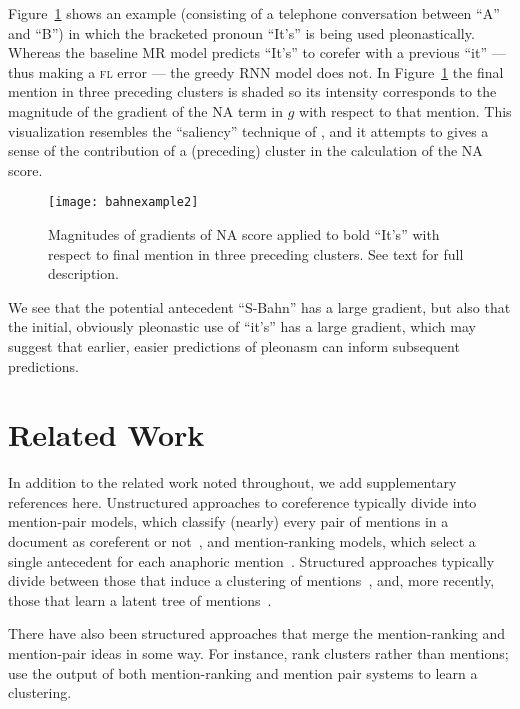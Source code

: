 \documentclass[11pt,letterpaper]{article}
\begin{document}
Figure~\ref{fig:flviz} shows an example (consisting of a telephone conversation between ``A'' and ``B'') in which the bracketed pronoun ``It's'' is being used pleonastically. Whereas the baseline MR model predicts ``It's'' to corefer with a previous ``it'' --- thus making a \textsc{fl} error --- the greedy RNN model does not. In Figure~\ref{fig:flviz} the final mention in three preceding clusters is shaded so its intensity corresponds to the magnitude of the gradient of the $\mathrm{NA}$ term in $g$ with respect to that mention. This visualization resembles the ``saliency'' technique of , and it attempts to gives a sense of the contribution of a (preceding) cluster in the  calculation of the $\mathrm{NA}$ score.

\begin{figure}[t!]
\centering
\texttt{[image: bahnexample2]}
\caption{Magnitudes of gradients of $\mathrm{NA}$ score applied to bold ``It's'' with respect to final mention in three preceding clusters. See text for full description.}
\label{fig:flviz}
\end{figure}

We see that the potential antecedent ``S-Bahn'' has a large gradient, but also that the initial, obviously pleonastic use of ``it's'' has a large gradient, which may suggest that earlier, easier predictions of pleonasm can inform subsequent predictions.
 
\section{Related Work}
In addition to the related work noted throughout, we add supplementary references here. Unstructured approaches to coreference typically divide into mention-pair models, which classify (nearly) every pair of mentions in a document as coreferent or not~\cite{soon2001machine,ng2002identifying,BandR:08}, and mention-ranking models, which select a single antecedent for each anaphoric mention~\cite{DandB:08,RandN:09,DandK:13,Chang:13,wiseman15learning}. Structured approaches typically divide between those that induce a clustering of mentions~\cite{mccallum2003toward,culotta2007first,poon08joint,haghighi2010coreference,stoyanov2012easy,cai10end}, and, more recently, those that learn a latent tree of mentions~\cite{fernandes2012latent,BandK:14,martschat15latent}. 
 

There have also been structured approaches that merge the mention-ranking and mention-pair ideas in some way. For instance,  rank clusters rather than mentions;  use the output of both mention-ranking and mention pair systems to learn a clustering.
  
\end{document}
